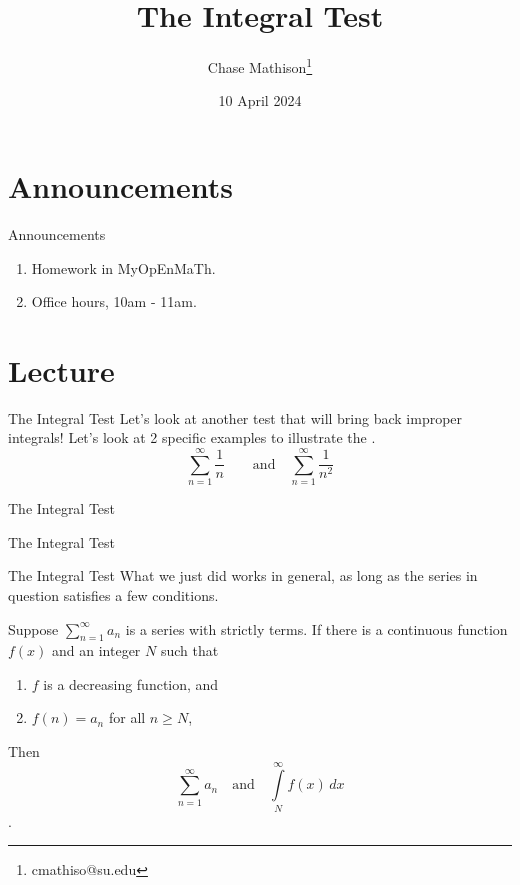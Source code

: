 \documentclass[presentation]{beamer}
\institute[SU]{Shenandoah University}
\author{Chase Mathison\thanks{cmathiso@su.edu}}
\date{10 April 2024}
\title{The Integral Test}
\begin{document}
\maketitle

\section{Announcements}
\label{sec:org5f19695}
\begin{frame}[label={sec:orgfdbad9e}]{Announcements}
\begin{enumerate}
\item Homework in MyOpEnMaTh.
\item Office hours, 10am - 11am.
\end{enumerate}
\end{frame}

\section{Lecture}
\label{sec:org89f4f62}
\begin{frame}[label={sec:org37b8f9a}]{The Integral Test}
Let's look at another test that will bring back improper integrals!  Let's look at 2 specific examples to illustrate the \uline{\hspace*{1in}}.
\[
\sum\limits_{n=1}^{\infty} \frac{1}{n}\qquad \text{and} \quad \sum\limits_{n=1}^{\infty} \frac{1}{n^2}\]
\vspace{10in}
\end{frame}

\begin{frame}[label={sec:orgc51cad6}]{The Integral Test}
\end{frame}

\begin{frame}[label={sec:org7066ab1}]{The Integral Test}
\end{frame}

\begin{frame}[label={sec:orgfe3e3c0}]{The Integral Test}
What we just did works in general, as long as the series in question satisfies a few conditions.

\begin{theorem}
Suppose \(\sum\limits_{n=1}^{\infty} a_n\) is a series with \alert{strictly} \uline{\hspace*{1in}} \alert{terms}.  If there is a continuous function
\(f(x)\) and an integer \(N\) such that
\begin{enumerate}
\item \(f\) is a decreasing function, and
\item \(f(n) = a_n\) for all \(n \ge N\),
\end{enumerate}

Then
\[
\sum\limits_{n=1}^{\infty} a_n \quad \text{and} \quad \int\limits_N^{\infty} f(x)\,dx\]
\uline{\hspace*{3in}}.
\end{theorem}
\end{frame}
\end{document}
